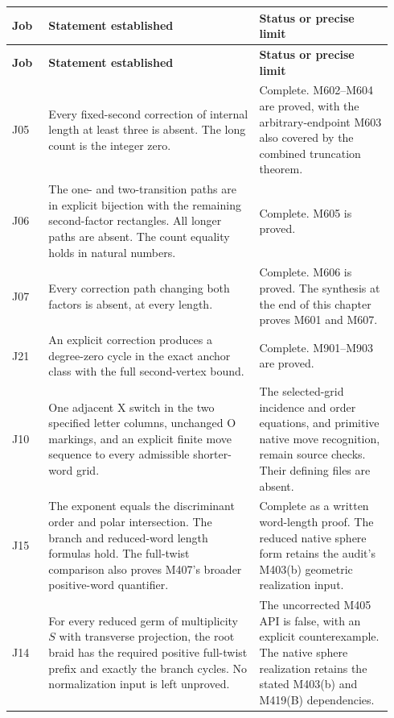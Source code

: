 \documentclass[11pt,oneside]{report}
\theoremstyle{definition}
\numberwithin{equation}{section}
\begin{document}
\begin{longtable}{@{}>{\raggedright\arraybackslash}p{0.09\linewidth}>{\raggedright\arraybackslash}p{0.52\linewidth}>{\raggedright\arraybackslash}p{0.33\linewidth}@{}}
\textbf{Job}&\textbf{Statement established}&\textbf{Status or precise limit}\\\hline
\endfirsthead
\textbf{Job}&\textbf{Statement established}&\textbf{Status or precise limit}\\\hline
\endhead
J05&Every fixed-second correction of internal length at least three is
absent. The long count is the integer zero.&Complete. M602--M604 are
proved, with the arbitrary-endpoint M603 also covered by the combined
truncation theorem.\\[5pt]
J06&The one- and two-transition paths are in explicit bijection with
the remaining second-factor rectangles. All longer paths are absent.
The count equality holds in natural numbers.&Complete. M605 is proved.\\[5pt]
J07&Every correction path changing both factors is absent, at every
length.&Complete. M606 is proved. The synthesis at the end of this
chapter proves M601 and M607.\\[5pt]
J21&An explicit correction produces a degree-zero cycle in the exact
anchor class with the full second-vertex bound.&Complete. M901--M903
are proved.\\[5pt]
J10&One adjacent X switch in the two specified letter columns,
unchanged O markings, and an explicit finite move sequence to every
admissible shorter-word grid.&The selected-grid incidence and order
equations, and primitive native move recognition, remain source
checks. Their defining files are absent.\\[5pt]
J15&The exponent equals the discriminant order and polar intersection.
The branch and reduced-word length formulas hold. The full-twist
comparison also proves M407's broader positive-word quantifier.
&Complete as a written word-length proof. The reduced native sphere
form retains the audit's M403(b) geometric realization input.\\[5pt]
J14&For every reduced germ of multiplicity $S$ with transverse
projection, the root braid has the required positive full-twist
prefix and exactly the branch cycles. No normalization input is
left unproved.&The uncorrected M405 API is false, with an explicit
counterexample. The native sphere realization retains the stated
M403(b) and M419(B) dependencies.\\\hline
\end{longtable}
\end{document}
